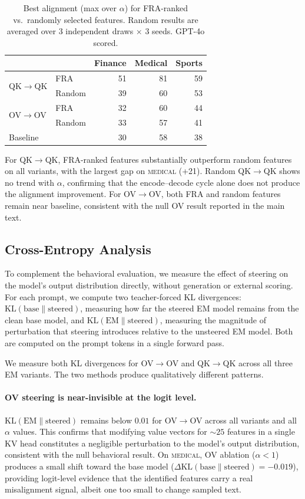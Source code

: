 \documentclass{article} %
\theoremstyle{plain}
\theoremstyle{definition}
\theoremstyle{remark}
\begin{document}
\begin{table}[h]
\caption{Best alignment (max over $\alpha$) for FRA-ranked vs.\ randomly selected features. Random results are averaged over 3 independent draws $\times$ 3 seeds. GPT-4o scored.}
\label{tab:random_baseline}
\centering
\small
\begin{tabular}{llrrr}
\toprule
 & & Finance & Medical & Sports \\
\midrule
\multirow{2}{*}{QK$\to$QK} & FRA & 51 & 81 & 59 \\
 & Random & 39 & 60 & 53 \\
\midrule
\multirow{2}{*}{OV$\to$OV} & FRA & 32 & 60 & 44 \\
 & Random & 33 & 57 & 41 \\
\midrule
Baseline & & 30 & 58 & 38 \\
\bottomrule
\end{tabular}
\end{table}

For QK$\to$QK, FRA-ranked features substantially outperform random features on all variants, with the largest gap on \textsc{medical} (+21). Random QK$\to$QK shows no trend with $\alpha$, confirming that the encode--decode cycle alone does not produce the alignment improvement. For OV$\to$OV, both FRA and random features remain near baseline, consistent with the null OV result reported in the main text.

\subsection{Cross-Entropy Analysis}\label{app:ce_analysis}

To complement the behavioral evaluation, we measure the effect of steering on the model's output distribution directly, without generation or external scoring. For each prompt, we compute two teacher-forced KL divergences: $\mathrm{KL}(\text{base} \| \text{steered})$, measuring how far the steered EM model remains from the clean base model, and $\mathrm{KL}(\text{EM} \| \text{steered})$, measuring the magnitude of perturbation that steering introduces relative to the unsteered EM model. Both are computed on the prompt tokens in a single forward pass.

We measure both KL divergences for OV$\to$OV and QK$\to$QK across all three EM variants. The two methods produce qualitatively different patterns.

\paragraph{OV steering is near-invisible at the logit level.} $\mathrm{KL}(\text{EM} \| \text{steered})$ remains below $0.01$ for OV$\to$OV across all variants and all $\alpha$ values. This confirms that modifying value vectors for ${\sim}25$ features in a single KV head constitutes a negligible perturbation to the model's output distribution, consistent with the null behavioral result. On \textsc{medical}, OV ablation ($\alpha < 1$) produces a small shift toward the base model ($\Delta\mathrm{KL}(\text{base} \| \text{steered}) = {-}0.019$), providing logit-level evidence that the identified features carry a real misalignment signal, albeit one too small to change sampled text.
\end{document}
